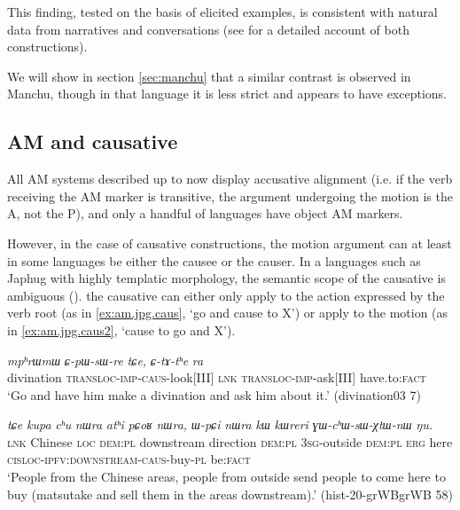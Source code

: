 \documentclass{article}
\newcommand{\ipa}[1]{\textit{{\phon\mbox{#1}}}} %
\begin{document}
This finding, tested on the basis of elicited examples, is consistent with natural data from narratives and conversations (see \citealt{jacques13harmonization} for a detailed account of both constructions).
  
We will show in section \ref{sec:manchu} that a similar contrast is observed in Manchu, though in that language it is less strict and appears to have exceptions.
  
\subsection{AM and causative} \label{sec:japhug.am.caus}
All AM systems described up to now display accusative alignment (i.e. if the verb receiving the AM marker is transitive, the argument undergoing the motion is the A, not the P), and only a handful of languages have object AM markers. 

However, in the case of causative constructions, the motion argument can at least in some languages be either the causee or the causer. In a languages such as Japhug with highly templatic morphology, the semantic scope of the causative is ambiguous (\citealt[182]{jacques15causative}). the causative can either only apply to the action expressed by the verb root (as in  \ref{ex:am.jpg.caus}, `go and cause to X')  or apply to the motion (as in \ref{ex:am.jpg.caus2}, `cause to go and X').

  \begin{exe}
\ex \label{ex:am.jpg.caus}
\gll
\ipa{mpʰrɯmɯ} 	\ipa{ɕ-pɯ-sɯ-re} 	\ipa{tɕe,} 	\ipa{ɕ-tɤ-tʰe} 	\ipa{ra} \\
divination \textsc{transloc-imp-caus}-look[III] \textsc{lnk} \textsc{transloc-imp}-ask[III] have.to:\textsc{fact} \\
\glt  `Go and have him make a divination and ask him about it.' (divination03 7)
  \end{exe} 

  \begin{exe}
\ex \label{ex:am.jpg.caus2}
\gll
\ipa{tɕe} 	\ipa{kupa} 	\ipa{cʰu} 	\ipa{nɯra} 	\ipa{atʰi} 	\ipa{pɕoʁ} 	\ipa{nɯra,} 	\ipa{ɯ-pɕi} 	\ipa{nɯra} 	\ipa{kɯ} 	\ipa{kɯreri} 	\ipa{ɣɯ-cʰɯ-sɯ-χtɯ-nɯ} 	\ipa{ŋu.}  \\
\textsc{lnk} Chinese \textsc{loc} \textsc{dem:pl} downstream direction \textsc{dem:pl} \textsc{3sg}-outside  \textsc{dem:pl}  \textsc{erg} here \textsc{cisloc-ipfv:downstream-caus}-buy-\textsc{pl} be\textsc{:fact} \\
\glt `People from the Chinese areas, people from outside send people to come here to buy (matsutake and sell them in the areas downstream).' (hist-20-grWBgrWB 58)
  \end{exe} 
  
\end{document}
